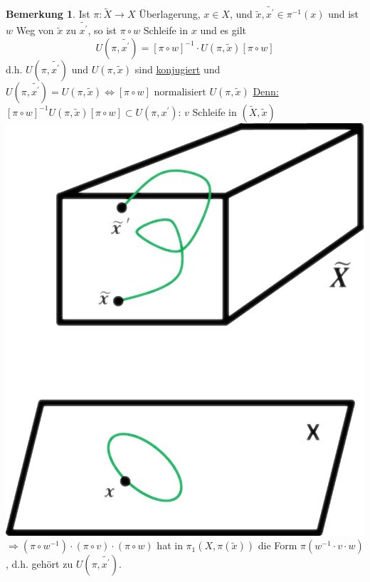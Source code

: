\documentclass[a4paper,11pt,notitlepage]{report}
\theoremstyle{definition}
\newtheorem{remark}{Bemerkung}[chapter]
\begin{document}
\begin{remark}
	Ist $\pi \colon \widetilde{X} \rightarrow X$ Überlagerung, $x \in X$, und $\widetilde{x}, \widetilde{x^\prime} \in \pi^{-1}(x)$ und ist $w$ Weg von $\widetilde{x}$ zu $\widetilde{x^\prime}$, so ist $\pi \circ w$ Schleife in $x$ und es gilt
	$$U(\pi, \widetilde{x^\prime}) = [\pi \circ w]^{-1} \cdot U(\pi, \widetilde{x})[\pi \circ w]$$
	d.h. $U(\pi, \widetilde{x^\prime})$ und $U(\pi, \widetilde{x})$ sind \underline{konjugiert} und \newline $U(\pi, \widetilde{x^\prime}) = U(\pi, \widetilde{x}) \Leftrightarrow [\pi \circ w] \text{ normalisiert } U(\pi, \widetilde{x})$
	\newline
	\underline{Denn:} $[\pi \circ w]^{-1} U(\pi, \widetilde{x}) [\pi \circ w] \subset U(\pi, x^\prime)$: $v$ Schleife in $(\widetilde{X}, \widetilde{x})$ \newline
	\includegraphics[scale=0.4]{images/Normalisation.png}
	\newline
	$\Rightarrow (\pi \circ w^{-1}) \cdot (\pi \circ v) \cdot (\pi \circ w)$ hat in $\pi_1(X, \pi(\widetilde{x}))$ die Form $\pi(w^{-1} \cdot v \cdot w)$, d.h. gehört zu $U(\pi, \widetilde{x^\prime})$.
\end{remark}
\end{document}
